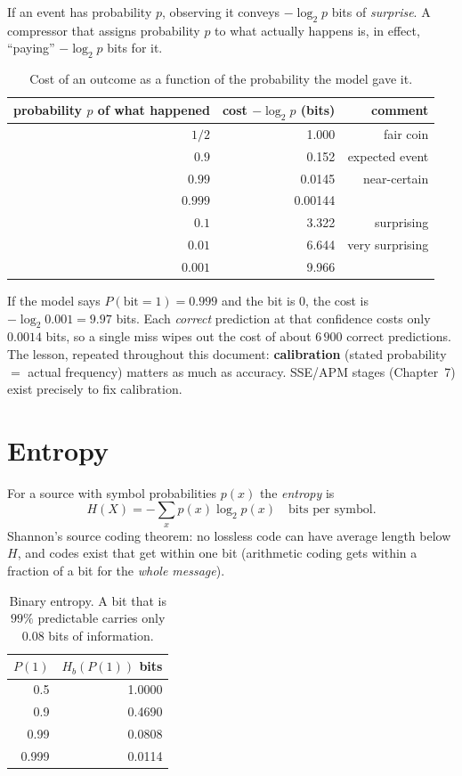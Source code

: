 \documentclass[11pt,a4paper,openany]{book}
\theoremstyle{definition}
\theoremstyle{remark}
\begin{document}
If an event has probability $p$, observing it conveys $-\log_2 p$ bits of \emph{surprise}. A compressor that assigns probability $p$ to what actually happens is, in effect, ``paying'' $-\log_2 p$ bits for it.

\begin{table}[h]
\centering
\begin{tabular}{@{}rrr@{}}
\toprule
probability $p$ of what happened & cost $-\log_2 p$ (bits) & comment\\
\midrule
$1/2$ & 1.000 & fair coin\\
$0.9$ & 0.152 & expected event\\
$0.99$ & 0.0145 & near-certain\\
$0.999$ & 0.00144 & \\
$0.1$ & 3.322 & surprising\\
$0.01$ & 6.644 & very surprising\\
$0.001$ & 9.966 & \\
\bottomrule
\end{tabular}
\caption{Cost of an outcome as a function of the probability the model gave it.}
\end{table}

\begin{pitfall}
If the model says $P(\text{bit}=1)=0.999$ and the bit is $0$, the cost is $-\log_2 0.001=9.97$ bits. Each \emph{correct} prediction at that confidence costs only $0.0014$ bits, so a single miss wipes out the cost of about $6\,900$ correct predictions. The lesson, repeated throughout this document: \textbf{calibration} (stated probability $=$ actual frequency) matters as much as accuracy. SSE/APM stages (Chapter~7) exist precisely to fix calibration.
\end{pitfall}

\section{Entropy}

For a source with symbol probabilities $p(x)$ the \emph{entropy} is
\[
H(X)=-\sum_x p(x)\log_2 p(x)\quad\text{bits per symbol.}
\]
Shannon's source coding theorem: no lossless code can have average length below $H$, and codes exist that get within one bit (arithmetic coding gets within a fraction of a bit for the \emph{whole message}).

\begin{table}[h]
\centering
\begin{tabular}{@{}rr@{}}
\toprule
$P(1)$ & $H_b(P(1))$ bits\\
\midrule
0.5 & 1.0000\\
0.9 & 0.4690\\
0.99 & 0.0808\\
0.999 & 0.0114\\
\bottomrule
\end{tabular}
\caption{Binary entropy. A bit that is $99\%$ predictable carries only $0.08$ bits of information.}
\end{table}
\end{document}
